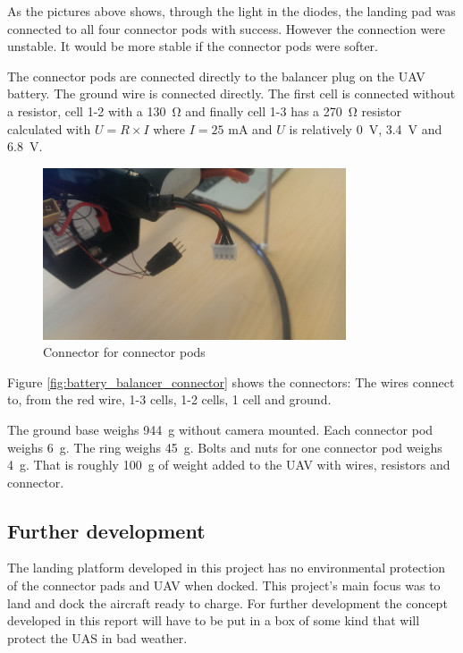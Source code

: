 As the pictures above shows, through the light in the diodes, the landing pad was connected to all four connector pods with success. However the connection were unstable. It would be more stable if the connector pods were softer.

The connector pods are connected directly to the balancer plug on the UAV battery. The ground wire is connected directly. The first cell is connected without a resistor, cell 1-2 with a \SI{130}{\ohm} and finally cell 1-3 has a \SI{270}{\ohm} resistor calculated with $U=R\times I$ where $I=25$ \si{\milli\ampere} and $U$ is relatively \SI{0}{\volt}, \SI{3.4}{\volt} and \SI{6.8}{\volt}.

\begin{figure}
	\centering
	\includegraphics[width=0.8\textwidth]{imgs/battery_balancer_connector}
	\caption{Connector for connector pods}
	\label{fig:battery_balancer_connector}
\end{figure}
Figure \vref{fig:battery_balancer_connector} shows the connectors: The wires connect to, from the red wire, 1-3 cells, 1-2 cells, 1 cell and ground.

The ground base weighs \SI{944}{\g} without camera mounted. Each connector pod weighs \SI{6}{\g}. The ring weighs \SI{45}{\g}. Bolts and nuts for one connector pod weighs \SI{4}{g}. That is roughly \SI{100}{g} of weight added to the UAV with wires, resistors and connector.


\subsection{Further development}
The landing platform developed in this project has no environmental protection of the connector pads and UAV when docked. This project's main focus was to land and dock the aircraft ready to charge. For further development the concept developed in this report will have to be put in a box of some kind that will protect the UAS in bad weather.

